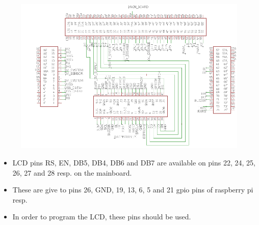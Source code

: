 \documentclass[a4paper,12pt,oneside]{book}
\begin{document}
\section*{\textbf{\fontsize{25}{10}\selectfont{6.LCD interface}}}
\begin{figure}[h]
	\includegraphics[width=1\textwidth]{lcd}
\end{figure}
\hfill
\begin{itemize}
	\item {LCD pins RS, EN, DB5, DB4, DB6 and DB7 are available on pins 22, 24, 25, 26, 27 and 28 resp. on the mainboard.}
	\item {These are give to pins 26, GND, 19, 13, 6, 5 and 21 gpio pins of raspberry pi resp.}
	\item {In order to program the LCD, these pins should be used.}
\end{itemize}
\pagebreak
\end{document}
